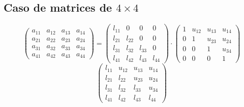 \documentclass[10pt,a4paper,dvipdfmx]{article}
\begin{document}
\subsection{Caso de matrices de $4\times 4$ }
$$ \left( 
\begin{array}{cccc}
a_{{1}{1}} & a_{{1}{2}} & a_{{1}{3}} & a_{{1}{4}} \\
a_{{2}{1}} & a_{{2}{2}} & a_{{2}{3}} & a_{{2}{4}} \\
a_{{3}{1}} & a_{{3}{2}} & a_{{3}{3}} & a_{{3}{4}} \\
a_{{4}{1}} & a_{{4}{2}} & a_{{4}{3}} & a_{{4}{4}} 
 \end{array}
\right)
 = \left( 
\begin{array}{cccc}
l_{{1}{1}} & 0 & 0 & 0 \\
l_{{2}{1}} & l_{{2}{2}} & 0 & 0 \\
l_{{3}{1}} & l_{{3}{2}} & l_{{3}{3}} & 0 \\
l_{{4}{1}} & l_{{4}{2}} & l_{{4}{3}} & l_{{4}{4}} 
 \end{array}
\right)
 \cdot \left( 
\begin{array}{cccc}
1 & u_{{1}{2}} & u_{{1}{3}} & u_{{1}{4}} \\
0 & 1 & u_{{2}{3}} & u_{{2}{4}} \\
0 & 0 & 1 & u_{{3}{4}} \\
0 & 0 & 0 & 1 
 \end{array}
\right)
 $$
$$ \left( 
\begin{array}{cccc}
l_{{1}{1}} & u_{{1}{2}} & u_{{1}{3}} & u_{{1}{4}} \\
l_{{2}{1}} & l_{{2}{2}} & u_{{2}{3}} & u_{{2}{4}} \\
l_{{3}{1}} & l_{{3}{2}} & l_{{3}{3}} & u_{{3}{4}} \\
l_{{4}{1}} & l_{{4}{2}} & l_{{4}{3}} & l_{{4}{4}} 
 \end{array}
\right)
 $$
\end{document}

